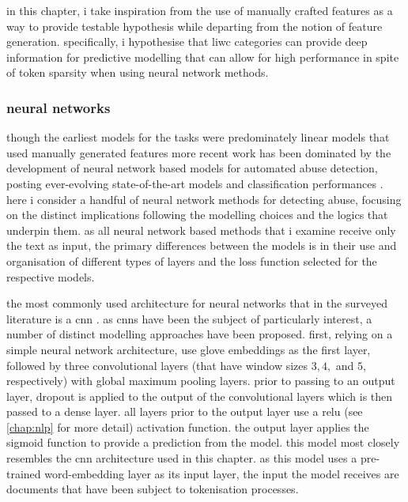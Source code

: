 \vspace{5mm}

in this chapter, i take inspiration from the use of manually crafted features as a way to provide testable hypothesis while departing from the notion of feature generation.
specifically, i hypothesise that liwc categories can provide deep information for predictive modelling that can allow for high performance in spite of token sparsity when using neural network methods.

\subsubsection{neural networks}\label{sec:liwc_nn}
though the earliest models for the tasks were predominately linear models that used manually generated features \citep{waseem-hovy:2016,davidson:2017,warner:2012} more recent work has been dominated by the development of neural network based models for automated abuse detection, posting ever-evolving state-of-the-art models and classification performances \citep[e.g.]{park:2017,badjatiya:2017,zimmerman:2018,stoop:2019,isaksen:2020}.
here i consider a handful of neural network methods for detecting abuse, focusing on the distinct implications following the modelling choices and the logics that underpin them.
as all neural network based methods that i examine receive only the text as input, the primary differences between the models is in their use and organisation of different types of layers and the loss function selected for the respective models.

the most commonly used architecture for neural networks that in the surveyed literature is a cnn \citep{park:2017,gamback:2017,wulczyn:2017,kolhatkar:2020,zimmerman:2018,wang:2020}.
as cnns have been the subject of particularly interest, a number of distinct modelling approaches have been proposed.
first, relying on a simple neural network architecture, \citet{kolhatkar:2020} use glove embeddings as the first layer, followed by three convolutional layers (that have window sizes $3, 4,$ and $5$, respectively) with global maximum pooling layers.
prior to passing to an output layer, dropout is applied to the output of the convolutional layers which is then passed to a dense layer.
all layers prior to the output layer use a relu (see \cref{chap:nlp} for more detail) activation function.
the output layer applies the sigmoid function to provide a prediction from the model.
this model most closely resembles the cnn architecture used in this chapter.
as this model uses a pre-trained word-embedding layer as its input layer, the input the model receives are documents that have been subject to tokenisation processes.

